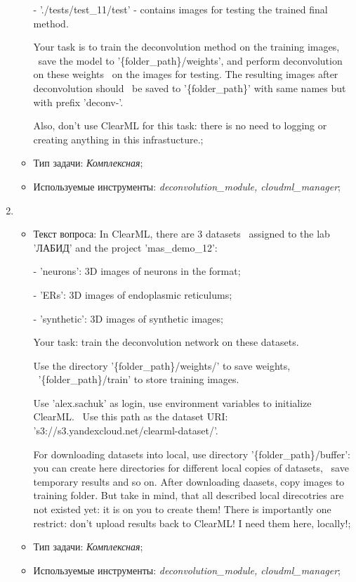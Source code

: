 \begin{enumerate}
\begin{itemize}
 - './tests/test\_11/test' - contains images for testing the trained final method.
	   
Your task is to train the deconvolution method on the training images, \
save the model to '\{folder\_path\}/weights', and perform deconvolution on these weights \
on the images for testing. The resulting images after deconvolution should \
be saved to '\{folder\_path\}' with same names but with prefix 'deconv-'.
										   
Also, don't use ClearML for this task: there is no need to logging or creating anything in this infrastucture.;
		\item Тип задачи: \textit{Комплексная};
		\item Используемые инструменты: \textit{deconvolution\_module, cloudml\_manager};
	\end{itemize}

	\item \begin{itemize}
		\item Текст вопроса: In ClearML, there are 3 datasets \
assigned to the lab 'ЛАБИД' and the project 'mas\_demo\_12':

- 'neurons': 3D images of neurons in the format;

- 'ERs': 3D images of endoplasmic reticulums;

- 'synthetic': 3D images of synthetic images;

Your task: train the deconvolution network on these datasets.

Use the directory '\{folder\_path\}/weights/' to save weights, \
'\{folder\_path\}/train' to store training images.
											
Use 'alex.sachuk' as login, use environment variables to initialize ClearML. \
Use this path as the dataset URI: 's3://s3.yandexcloud.net/clearml-dataset/'.

For downloading datasets into local, use directory '\{folder\_path\}/buffer': 
you can create here directories for different local copies of datasets, \
save temporary results and so on. After downloading daasets, 
copy images to training folder. But take in mind, that all described local direcotries are 
not existed yet: it is on you to create them!
There is importantly one restrict: don't upload results back to ClearML! I need them here, locally!;
		\item Тип задачи: \textit{Комплексная};
		\item Используемые инструменты: \textit{deconvolution\_module, cloudml\_manager};
	\end{itemize}


\end{enumerate}
